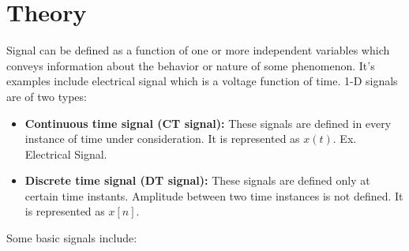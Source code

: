 \section*{Theory}
Signal can be defined as a function of one or more independent variables 
which conveys information about the behavior or nature of some phenomenon. 
It’s examples include electrical signal which is a voltage function of time.
 1-D signals are of two types:
 \begin{itemize}
    \item \textbf{Continuous time signal (CT signal):}
    These signals are defined in every instance of
time under consideration. It is represented as $x(t)$. Ex. Electrical Signal.
    \item \textbf{Discrete time signal (DT signal):}
    These signals are defined only at certain time
instants. Amplitude between two time instances is not defined. It is represented as $x[n]$.
 \end{itemize}
Some basic signals include:
